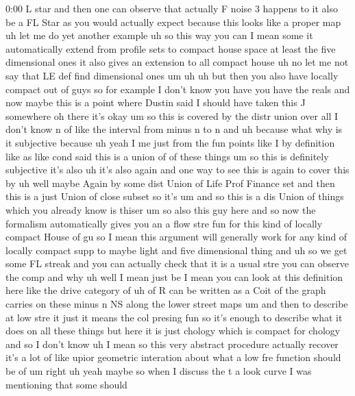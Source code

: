 \begin{unfinished}{0:00}
L
star  and
then
one  can
observe  that  actually  F  noise  3  happens
to  it  also  be  a  FL  Star  as  you  would
actually  expect  because  this  looks  like
a  proper
map  uh  let  me  do  yet  another
example  uh  so  this  way  you  can  I  mean
some  it  automatically  extend  from
profile  sets  to  compact  house  space  at
least  the  five  dimensional
ones  it  also  gives  an  extension  to  all
compact  house  uh  no  let  me  not  say  that
LE  def  find  dimensional  ones
um
uh  uh  but  then  you  also  have  locally
compact  out  of  guys  so  for  example  I
don't  know  you  have  you  have  the
reals  and  now  maybe  this  is  a  point
where  Dustin  said  I  should  have  taken
this  J  somewhere
oh  there  it's  okay
um  so  this  is  covered  by  the  distr  union
over  all  I  don't  know  n  of  like  the
interval  from  minus  n  to
n  and  uh  because  what  why  is  it
subjective
because
uh
yeah  I  me  just  from  the  fun  points  like
I  by  definition  like  as  like  cond  said
this  is  a  union  of  of  these  things
um  so  this  is  definitely  subjective  it's
also  uh  it's
also  again  and  one  way  to  see  this  is
again  to  cover  this
by  uh  well  maybe  Again  by  some  dist
Union  of  Life  Prof  Finance  set  and  then
this  is  a  just  Union  of  close  subset  so
it's  um  and  so  this  is  a  dis  Union  of
things  which  you  already  know  is
thiser  um  so
also  this  guy
here  and  so  now  the  formalism
automatically  gives  you  an  a  flow  stre
fun  for  this  kind  of  locally  compact
House  of  gu  so  I  mean  this  argument  will
generally  work  for  any  kind  of  locally
compact  supp  to  maybe  light  and  five
dimensional
thing  and
uh  so  we  get  some  FL  streak  and  you  can
actually  check  that  it  is  a  usual
stre  you  can
observe  the
comp
and
why
uh  well  I  mean  just  be  I  mean  you  can
look  at  this  definition  here
like  the  drive  category  of  uh  of  R  can
be  written  as  a  Coit  of  the  graph
carries  on  these  minus  n  NS  along  the
lower  street  maps
um  and  then  to  describe  at  low  stre  it
just  it  means  the  col  presing  fun  so
it's  enough  to  describe  what  it  does  on
all  these  things  but  here  it  is  just
chology  which  is  compact  for
chology  and
so  I  don't  know  uh  I  mean  so  this  very
abstract  procedure  actually  recover  it's
a  lot  of  like  upior  geometric  interation
about  what  a  low  fre  function  should  be
of
um  right
uh
yeah
maybe  so  when  I  discuss  the  t  a  look
curve  I  was  mentioning  that  some  should

\end{unfinished}
